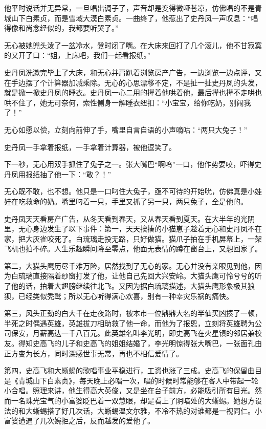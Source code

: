 他平时说话并无异常，一旦唱出调子了，声音却是变得微哑苍凉，仿佛唱的不是青城山下白素贞，而是雪域大漠白素贞。一曲终了，他惹出了史丹凤一声叹息：``唱得像和尚念经似的，我都要听哭了。''

无心被她兜头泼了一盆冷水，登时闭了嘴。在大床来回打了几个滚儿，他不甘寂寞的又开了口：``姐，上床吧，我们一起看报纸。''

史丹凤洗漱完毕上了大床，和无心并肩趴着浏览房产广告，一边浏览一边点评，又在手边摆了个计算器加减乘除。无心的心思漂移不定，不是扯一扯史丹凤的头发，就是掀一掀史丹凤的睡衣。史丹凤一心二用的撵着他哄着他，最后撵也撵不走哄也哄不住了，她无可奈何，索性侧身一解睡衣纽扣：``小宝宝，给你吃奶，别闹我了！''

无心如愿以偿，立刻向前伸了手，嘴里自言自语的小声嘀咕：``两只大兔子！''

史丹凤一手拿着报纸，一手拿着计算器，被他逗笑了。

下一秒，无心用双手抓住了兔子之一。张大嘴巴``啊呜''一口，他作势要咬，吓得史丹凤用报纸抽了他一下：``敢？！''

无心既不敢，也不想。他只是一口叼住大兔子，亟不可待的开始吮，仿佛真是小娃娃在吃救命的奶。嘴里叼着一只，手里又抓了另一只，两只兔子，全是他的。

史丹凤天天看房产广告，从冬天看到春天，又从春天看到夏天。在大半年的光阴里，无心身边发生了以下事件：第一，天天挨揍的小猫崽子趁着无心和史丹凤不在家，把大灰雀咬死了。白琉璃走投无路，只好做猫。猫爪子拍在手机屏幕上，一架飞机也拍不碎。人生乐趣瞬间降至零点，他面无表情的蹲在窗台上，又想回家了。

第二，大猫头鹰历尽千难万险，居然找到了无心的家。无心并没有亲眼见到他，因为白琉璃直接隔着纱窗打发了他，让他自己先回大兴安岭。大猫头鹰可怜兮兮的听了他的话，拍着大翅膀继续往北飞。又因为据白琉璃描述，大猫头鹰形象极其狼狈，已经类似秃鹫；所以无心听得满心欢喜，别有一种幸灾乐祸的痛快。

第三，风头正劲的白大千在走夜路时，被本市一位鼎鼎大名的半仙买凶揍了一顿，半死之时偶遇英雄，英雄拔刀相助救了他一命，而他为了报恩，立刻将英雄聘为公司保安，月薪高达一千八百元。此英雄名叫李光明，即史高飞在火星镇的邻居兼校友。得知史高飞的儿子和史高飞的姐姐结婚了，李光明惊得张大嘴巴，一张面孔由正方变为长方，同时深感世事无常，再也不相信爱情了。

第四，史高飞和大蜥蜴的歌唱事业平稳进行，工资也涨了三成。史高飞的保留曲目是《青城山下白素贞》，每天晚上必唱一次，唱的时候时常能够在客人中带起一轮小合唱。照理来讲，他生得高大英俊，又是坐在台子前方，必能吸引所有目光。然而一名珠光宝气的小富婆眨巴着一双慧眼，却是看上了阴暗处的大蜥蜴。她想方设法的和大蜥蜴搭了好几次话，大蜥蜴温文尔雅，不冷不热的对谁都是一视同仁。小富婆遭遇了几次婉拒之后，反而越发的爱他了。

